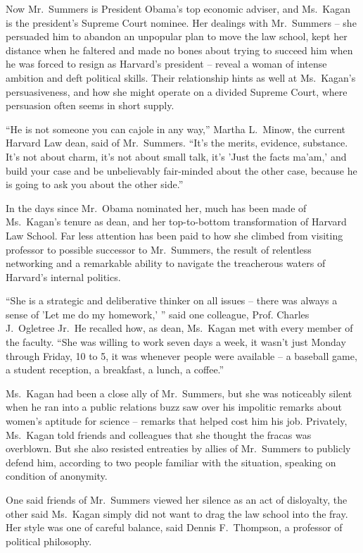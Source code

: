 ﻿\documentclass[12pt]{article}
\begin{document}
Now Mr.~Summers is President Obama's top economic adviser, and Ms.~Kagan is the president's Supreme
Court nominee. Her dealings with Mr.~Summers -- she persuaded him to abandon an unpopular plan to
move the law school, kept her distance when he faltered and made no bones about trying to succeed
him when he was forced to resign as Harvard's president -- reveal a woman of intense ambition and
deft political skills. Their relationship hints as well at Ms.~Kagan's persuasiveness, and how she
might operate on a divided Supreme Court, where persuasion often seems in short supply.

``He is not someone you can cajole in any way,'' Martha L.~Minow, the current Harvard Law dean, said
of Mr.~Summers. ``It's the merits, evidence, substance. It's not about charm, it's not about small
talk, it's 'Just the facts ma'am,' and build your case and be unbelievably fair-minded about the
other case, because he is going to ask you about the other side.''

In the days since Mr.~Obama nominated her, much has been made of Ms.~Kagan's tenure as dean, and her
top-to-bottom transformation of Harvard Law School. Far less attention has been paid to how she
climbed from visiting professor to possible successor to Mr.~Summers, the result of relentless
networking and a remarkable ability to navigate the treacherous waters of Harvard's internal
politics.

``She is a strategic and deliberative thinker on all issues -- there was always a sense of 'Let me
do my homework,' '' said one colleague, Prof. Charles J.~Ogletree Jr.~He recalled how, as dean,
Ms.~Kagan met with every member of the faculty. ``She was willing to work seven days a week, it
wasn't just Monday through Friday, 10 to 5, it was whenever people were available -- a baseball
game, a student reception, a breakfast, a lunch, a coffee.''

Ms.~Kagan had been a close ally of Mr.~Summers, but she was noticeably silent when he ran into a
public relations buzz saw over his impolitic remarks about women's aptitude for science -- remarks
that helped cost him his job. Privately, Ms.~Kagan told friends and colleagues that she thought the
fracas was overblown. But she also resisted entreaties by allies of Mr.~Summers to publicly defend
him, according to two people familiar with the situation, speaking on condition of anonymity.

One said friends of Mr.~Summers viewed her silence as an act of disloyalty, the other said Ms.~Kagan
simply did not want to drag the law school into the fray. Her style was one of careful balance, said
Dennis F.~Thompson, a professor of political philosophy.
\end{document}
